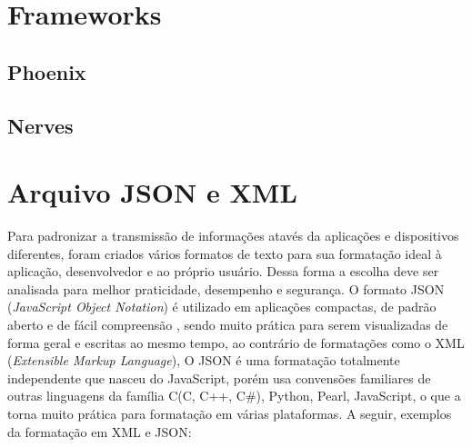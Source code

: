 \documentclass[../../layout.tex]{subfiles}
\begin{document}
\section{Frameworks}
\hspace*{3em}\blindtext[1]
\subsection{Phoenix}
\hspace*{3em}\blindtext[1]
\subsection{Nerves}
\hspace*{3em}\blindtext[1]
\section{Arquivo JSON e XML}
\hspace*{3em}Para padronizar a transmissão de informações atavés da aplicações e dispositivos diferentes, foram criados vários formatos de texto para sua formatação ideal à aplicação, desenvolvedor e ao próprio usuário. Dessa forma a escolha deve ser analisada para melhor praticidade, desempenho e segurança. O formato JSON (\textit{JavaScript Object Notation}) é utilizado em aplicações compactas, de padrão aberto e de fácil compreensão , sendo muito prática para serem visualizadas de forma geral e escritas ao mesmo tempo, ao contrário de formatações como o XML (\textit{Extensible Markup Language}), O JSON é uma formatação totalmente independente que nasceu do JavaScript, porém usa convensões familiares de outras linguagens da família C(C, C++, C#), Python, Pearl, JavaScript, o que a torna muito prática para formatação em várias plataformas. A seguir, exemplos da formatação em XML e JSON:
\end{document}

